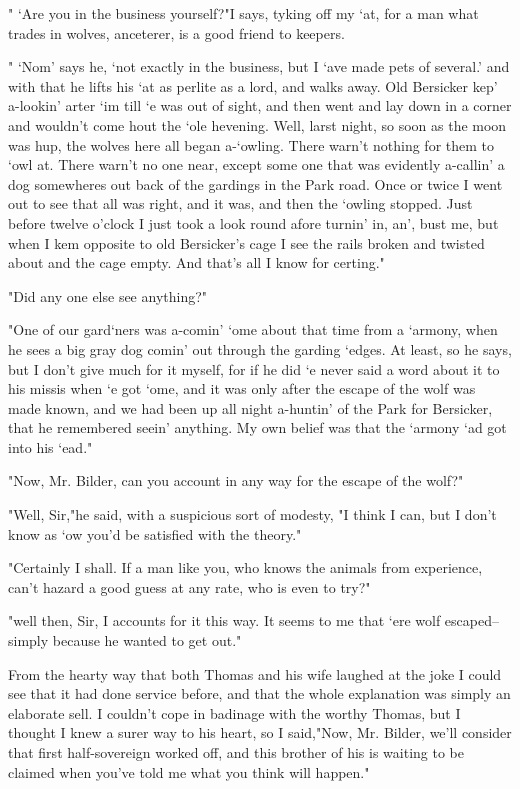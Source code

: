" `Are you in the business yourself?"I says, tyking off my `at, for a man what trades in wolves, anceterer, is a good friend to keepers. 

" `Nom' says he, `not exactly in the business, but I `ave made pets of several.' and with that he lifts his `at as perlite as a lord, and walks away. Old Bersicker kep' a-lookin' arter `im till `e was out of sight, and then went and lay down in a corner and wouldn't come hout the `ole hevening. Well, larst night, so soon as the moon was hup, the wolves here all began a-`owling. There warn't nothing for them to `owl at. There warn't no one near, except some one that was evidently a-callin' a dog somewheres out back of the gardings in the Park road. Once or twice I went out to see that all was right, and it was, and then the `owling stopped. Just before twelve o'clock I just took a look round afore turnin' in, an', bust me, but when I kem opposite to old Bersicker's cage I see the rails broken and twisted about and the cage empty. And that's all I know for certing." 

"Did any one else see anything?" 

"One of our gard`ners was a-comin' `ome about that time from a `armony, when he sees a big gray dog comin' out through the garding `edges. At least, so he says, but I don't give much for it myself, for if he did `e never said a word about it to his missis when `e got `ome, and it was only after the escape of the wolf was made known, and we had been up all night a-huntin' of the Park for Bersicker, that he remembered seein' anything. My own belief was that the `armony `ad got into his `ead." 

"Now, Mr. Bilder, can you account in any way for the escape of the wolf?" 

"Well, Sir,"he said, with a suspicious sort of modesty, "I think I can, but I don't know as `ow you'd be satisfied with the theory." 

"Certainly I shall. If a man like you, who knows the animals from experience, can't hazard a good guess at any rate, who is even to try?" 

"well then, Sir, I accounts for it this way. It seems to me that `ere wolf escaped--simply because he wanted to get out." 

From the hearty way that both Thomas and his wife laughed at the joke I could see that it had done service before, and that the whole explanation was simply an elaborate sell. I couldn't cope in badinage with the worthy Thomas, but I thought I knew a surer way to his heart, so I said,"Now, Mr. Bilder, we'll consider that first half-sovereign worked off, and this brother of his is waiting to be claimed when you've told me what you think will happen." 

